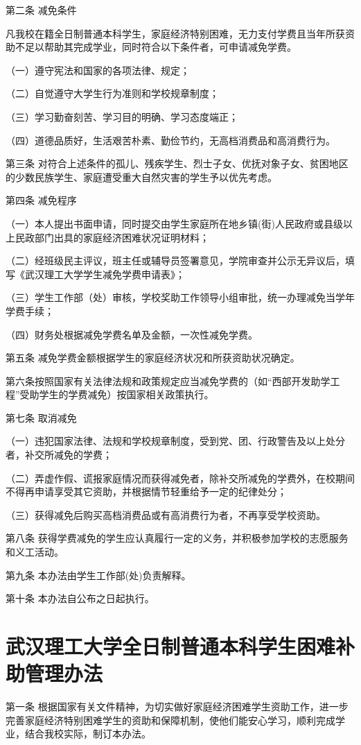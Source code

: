 \documentclass[UTF8,12pt,a4paper]{report}
\begin{document}
第二条 减免条件

凡我校在籍全日制普通本科学生，家庭经济特别困难，无力支付学费且当年所获资助不足以帮助其完成学业，同时符合以下条件者，可申请减免学费。

（一）遵守宪法和国家的各项法律、规定；

（二）自觉遵守大学生行为准则和学校规章制度；

（三）学习勤奋刻苦、学习目的明确、学习态度端正；

（四）道德品质好，生活艰苦朴素、勤俭节约，无高档消费品和高消费行为。

第三条 对符合上述条件的孤儿、残疾学生、烈士子女、优抚对象子女、贫困地区的少数民族学生、家庭遭受重大自然灾害的学生予以优先考虑。

第四条 减免程序

（一）本人提出书面申请，同时提交由学生家庭所在地乡镇(街)人民政府或县级以上民政部门出具的家庭经济困难状况证明材料；

（二）经班级民主评议，班主任或辅导员签署意见，学院审查并公示无异议后，填写《武汉理工大学学生减免学费申请表》；

（三）学生工作部（处）审核，学校奖助工作领导小组审批，统一办理减免当学年学费手续；

（四）财务处根据减免学费名单及金额，一次性减免学费。

第五条 减免学费金额根据学生的家庭经济状况和所获资助状况确定。

第六条按照国家有关法律法规和政策规定应当减免学费的（如“西部开发助学工程”受助学生的学费减免）按国家相关政策执行。

第七条 取消减免

（一）违犯国家法律、法规和学校规章制度，受到党、团、行政警告及以上处分者，补交所减免的学费；

（二）弄虚作假、谎报家庭情况而获得减免者，除补交所减免的学费外，在校期间不得再申请享受其它资助，并根据情节轻重给予一定的纪律处分；

（三）获得减免后购买高档消费品或有高消费行为者，不再享受学校资助。

第八条 获得学费减免的学生应认真履行一定的义务，并积极参加学校的志愿服务和义工活动。

第九条 本办法由学生工作部(处)负责解释。

第十条 本办法自公布之日起执行。

\chapter{武汉理工大学全日制普通本科学生困难补助管理办法}
第一条 根据国家有关文件精神，为切实做好家庭经济困难学生资助工作，进一步完善家庭经济特别困难学生的资助和保障机制，使他们能安心学习，顺利完成学业，结合我校实际，制订本办法。
\end{document}
